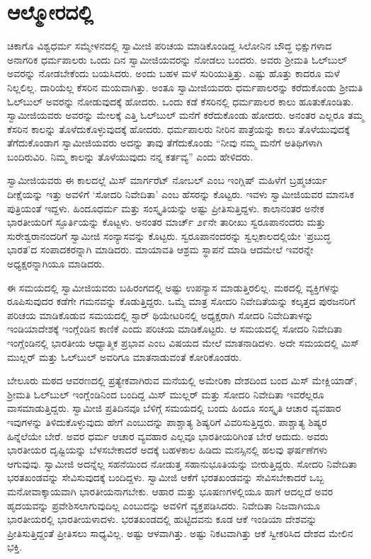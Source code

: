 
\chapter{ಆಲ್ಮೋರದಲ್ಲಿ }

 ಚಿಕಾಗೊ ವಿಶ್ವಧರ್ಮ ಸಮ್ಮೇಳನದಲ್ಲಿ ಸ್ವಾಮೀಜಿ ಪರಿಚಯ ಮಾಡಿಕೊಂಡಿದ್ದ ಸಿಲೋನಿನ ಬೌದ್ಧ ಭಿಕ್ಷುಗಳಾದ ಅನಾಗರಿಕ ಧರ್ಮಪಾಲರು ಒಂದು ದಿನ ಸ್ವಾಮೀಜಿಯವರನ್ನು ನೋಡಲು ಬಂದರು. ಅವರು ಶ‍್ರೀಮತಿ ಓಲ್‍ಬುಲ್ ಅವರನ್ನು ನೋಡಬೇಕೆಂದು ಬಯಸಿದರು. ಅಂದು ಬಹಳ ಮಳೆ ಸುರಿಯುತ್ತಿತ್ತು. ಎಷ್ಟು ಹೊತ್ತು ಕಾದರೂ ಮಳೆ ನಿಲ್ಲಲಿಲ್ಲ. ದಾರಿಯೆಲ್ಲ ಕೆಸರಿನ ಮಯವಾಗಿತ್ತು. ಅಂತೂ ಸ್ವಾಮೀಜಿಯವರು ಧರ್ಮಪಾಲರನ್ನು ಕರೆದುಕೊಂಡು ಶ‍್ರೀಮತಿ ಓಲ್‍ಬುಲ್ ಅವರನ್ನು ನೋಡುವುದಕ್ಕೆ ಹೋದರು. ಒಂದು ಕಡೆ ಕೆಸರಿನಲ್ಲಿ ಧರ್ಮಪಾಲರ ಕಾಲು ಹೂತುಕೊಂಡಿತು. ಸ್ವಾಮೀಜಿಯವರು ಅವರನ್ನು ಮೇಲಕ್ಕೆ ಎತ್ತಿ ಓಲ್‍ಬುಲ್ ಮನೆಗೆ ಕರೆದುಕೊಂಡು ಹೋದರು. ಅನಂತರ ಎಲ್ಲರೂ ತಮ್ಮ ಕೆಸರಿನ ಕಾಲನ್ನು ತೊಳೆದುಕೊಳ್ಳುವುದಕ್ಕೆ ಹೋದರು. ಧರ್ಮಪಾಲರು ನೀರಿನ ಪಾತ್ರೆಯನ್ನು ಕಾಲು ತೊಳೆಯುವುದಕ್ಕೆ ತೆಗೆದುಕೊಂಡಾಗ ಸ್ವಾಮೀಜಿಯವರು ಅದನ್ನು ತಾವು ತೆಗೆದುಕೊಂಡು “ನೀವು ನಮ್ಮ ಮನೆಗೆ ಅತಿಥಿಗಳಾಗಿ ಬಂದಿರುವಿರಿ. ನಿಮ್ಮ ಕಾಲನ್ನು ತೊಳೆಯುವುದು ನನ್ನ ಕರ್ತವ್ಯ” ಎಂದು ಹೇಳಿದರು. 

 ಸ್ವಾಮೀಜಿಯವರು ಈ ಕಾಲದಲ್ಲೆ ಮಿಸ್ ಮಾರ್ಗರೆಟ್ ನೋಬಲ್ ಎಂಬ ಇಂಗ್ಲಿಷ್ ಮಹಿಳೆಗೆ ಬ್ರಹ್ಮಚರ್ಯ ದೀಕ್ಷೆಯನ್ನು ಇತ್ತು ಅವಳಿಗೆ ‘ಸೋದರಿ ನಿವೇದಿತಾ’ ಎಂಬ ಹೆಸರನ್ನು ಕೊಟ್ಟರು. ಇವಳು ಸ್ವಾಮೀಜಿಯವರ ಮಾನಸಿಕ ಪುತ್ರಿಯಂತೆ ಇದ್ದಳು. ಹಿಂದೂಧರ್ಮ ಮತ್ತು ಸಂಸ್ಕೃತಿಯನ್ನು ಅಷ್ಟು ಪ್ರೀತಿಸುತ್ತಿದ್ದಳು. ಕಾಲಾನಂತರ ಅನೇಕ ಭಾರತೀಯರಿಗೆ ಸ್ಫೂರ್ತಿಯನ್ನು ಕೊಟ್ಟಳು. ಅನಂತರ ಮಾರ್ಚ್ ೨೯ನೇ ತಾರೀಖು ಸ್ವರೂಪಾನಂದರು ಮತ್ತು ಸುರೇಶ್ವರಾನಂದರಿಗೆ ಸ್ವಾಮೀಜಿ ಸಂನ್ಯಾಸವನ್ನು ಕೊಟ್ಟರು. ಸ್ವರೂಪಾನಂದರನ್ನು ಸ್ವಲ್ಪಕಾಲದಲ್ಲಿಯೇ ‘ಪ್ರಬುದ್ಧ ಭಾರತ’ದ ಸಂಪಾದಕರನ್ನಾಗಿ ಮಾಡಿದರು. ಮಾಯಾವತಿ ಆಶ್ರಮ ಸ್ಥಾಪನೆ ಮಾಡಿ ಆದಮೇಲೆ ಇವರನ್ನೇ ಅಧ್ಯಕ್ಷರನ್ನಾಗಿಯೂ ಮಾಡಿದರು. 

 ಈ ಸಮಯದಲ್ಲಿ ಸ್ವಾಮೀಜಿಯವರು ಬಹಿರಂಗದಲ್ಲಿ ಅಷ್ಟು ಉಪನ್ಯಾಸ ಮಾಡುತ್ತಿರಲಿಲ್ಲ. ಮಠದಲ್ಲಿ ವ್ಯಕ್ತಿಗಳನ್ನು ರೂಪಿಸುವುದರ ಕಡೆಗೇ ಗಮನವನ್ನು ಕೊಡುತ್ತಿದ್ದರು. ಒಮ್ಮೆ ಮಾತ್ರ ಸೋದರಿ ನಿವೇದಿತೆಯನ್ನು ಕಲ್ಕತ್ತದ ಪುರಜನರಿಗೆ ಪರಿಚಯ ಮಾಡಿಕೊಡುವ ಸಮಯದಲ್ಲಿ ಸ್ಟಾರ್ ಥಿಯೇಟರಿನಲ್ಲಿ ಅಧ್ಯಕ್ಷರಾಗಿ ಸೋದರಿ ನಿವೇದಿತಾಳನ್ನು ಇಂಡಿಯಾದೇಶಕ್ಕೆ ಇಂಗ್ಲೆಂಡಿನ ಕಾಣಿಕೆ ಎಂದು ಪರಿಚಯ ಮಾಡಿಕೊಟ್ಟರು. ಆ ಸಮಯದಲ್ಲಿ ಸೋದರಿ ನಿವೇದಿತಾ ಇಂಗ್ಲೆಂಡಿನಲ್ಲಿ ಭಾರತೀಯ ಆಧ್ಯಾತ್ಮಿಕ ಪ್ರಭಾವ ಎಂಬ ವಿಷಯದ ಮೇಲೆ ಮಾತನಾಡಿದಳು. ಅದೇ ಸಮಯದಲ್ಲಿ ಮಿಸ್ ಮುಲ್ಲರ್ ಮತ್ತು ಓಲ್‍ಬುಲ್ ಅವರಿಗೂ ಮಾತನಾಡುವಂತೆ ಕೋರಿಕೊಂಡರು. 

 ಬೇಲೂರು ಮಠದ ಆವರಣದಲ್ಲಿ ಪ್ರತ್ಯೇಕವಾಗಿರುವ ಮನೆಯಲ್ಲಿ ಅಮೇರಿಕಾ ದೇಶದಿಂದ ಬಂದ ಮಿಸ್ ಮೇಕ್ಲಿಯಾಡ್, ಶ‍್ರೀಮತಿ ಓಲ್‍ಬುಲ್ ಇಂಗ್ಲೆಂಡಿನಿಂದ ಬಂದಿದ್ದ ಮಿಸ್ ಮುಲ್ಲರ್ ಮತ್ತು ಸೋದರಿ ನಿವೇದಿತಾ ಇವರೆಲ್ಲರೂ ವಾಸಮಾಡುತ್ತಿದ್ದರು. ಸ್ವಾಮೀಜಿ ಪ್ರತಿದಿನವೂ ಬೆಳಿಗ್ಗೆ ಸಮಯದಲ್ಲಿ ಬಂದು ಹಿಂದೂ ಸಂಸ್ಕೃತಿ ಆಚಾರ ವ್ಯವಹಾರ ಇವುಗಳನ್ನು ತಿಳಿದುಕೊಳ್ಳುವುದು ಹೇಗೆ ಎಂಬುದನ್ನು ಪಾಶ್ಚಾತ್ಯ ಶಿಷ್ಯರಿಗೆ ವಿವರಿಸುತ್ತಿದ್ದರು. ಪಾಶ್ಚಾತ್ಯ ಶಿಷ್ಯರ ಹಿನ್ನೆಲೆಯೇ ಬೇರೆ. ಅವರ ಧರ್ಮ ಆಚಾರ ವ್ಯವಹಾರ ಎಲ್ಲವೂ ಭಾರತೀಯರಿಗಿಂತ ಬೇರೆ ಆದುದು. ಅವರು ಭಾರತೀಯರ ದೃಷ್ಟಿಯನ್ನು ಬೆಳಸಬೇಕಾದರೆ ಅದಕ್ಕೆ ಬಹಳಕಾಲ ಹಿಡಿದು ಮನಸ್ಸಿನಲ್ಲಿ ಹಲವು ಘರ್ಷಣೆಗಳು ಆಗುವುವು. ಸ್ವಾಮೀಜಿ ಅದನ್ನೆಲ್ಲ ಸಹನೆಯಿಂದ ನೋಡುತ್ತ ಸಹಾನುಭೂತಿಯನ್ನು ಬೀರುತ್ತಿದ್ದರು. ಸೋದರಿ ನಿವೇದಿತಾ ಭರತಖಂಡವನ್ನು ಸೇವಿಸುವುದಕ್ಕೆ ಬಂದಿದ್ದಳು. ಸ್ವಾಮೀಜಿ ಆಕೆಗೆ ಭರತಖಂಡವನ್ನು ಸೇವಿಸಬೇಕಾದರೆ ಒಬ್ಬ ಮನೋವಾಕ್ಕಾಯವಾಗಿ ಭಾರತೀಯನಾಗಬೇಕು. ಆಹಾರ ಮತ್ತು ಭೂಷಣಗಳಲ್ಲಿಯೂ ಹಾಗೆ ಆದಲ್ಲದೆ ಅವರ ಹೃದಯವನ್ನು ಪ್ರವೇಶಿಸಲಾಗುವುದಿಲ್ಲ ಎಂಬುದನ್ನು ಅವಳಿಗೆ ವ್ಯಕ್ತಪಡಿಸಿದರು. ನಿವೇದಿತಾ ನಿಜವಾಗಿಯೂ ಭಾರತೀಯರಲ್ಲಿ ಭಾರತೀಯಳಾದಳು. ಭರತಖಂಡದಲ್ಲಿ ಹುಟ್ಟಿದವನು ಕೂಡ ಆಕೆ ಇಂಡಿಯಾ ದೇಶವನ್ನು ಪ್ರೀತಿಸುತ್ತಿದ್ದಂತೆ ಪ್ರೀತಿಸಲು ಸಾಧ್ಯವಿಲ್ಲ. ಅಷ್ಟು ಆಳವಾಗಿತ್ತು. ಅಷ್ಟು ನಿಕಟವಾಗಿತ್ತು ಆಕೆ ಸ್ವೀಕರಿಸಿದ ದೇಶದ ಮೇಲಿನ ಭಕ್ತಿ. 

